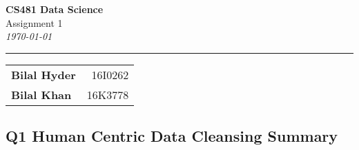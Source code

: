 \documentclass[12pt]{article}
\begin{document}
\begin{flushright}
	\Huge{\textbf{CS481 Data Science}} \\
	\Large{Assignment 1} \\
	\emph{\large{\today}} \\
	\centering \rule{450pt}{1pt}
	\begin{table}[h!]
		\begin{center}
			\begin{tabular}{lr}
				\large{\textbf{Bilal Hyder}} & \large{16I0262} \\
				\large{\textbf{Bilal Khan}} & \large{16K3778}\\
			\end{tabular}
		\end{center}
	\end{table}
\end{flushright}

\subsection*{Q1 Human Centric Data Cleansing Summary}
\end{document}
